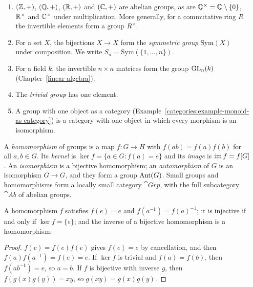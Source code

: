 \begin{example}\label{groups:example-groups}
\begin{enumerate}
\item $(\mathbb{Z}, +)$, $(\mathbb{Q}, +)$, $(\mathbb{R}, +)$ and $(\mathbb{C}, +)$ are abelian groups, as are
$\mathbb{Q}^\times = \mathbb{Q} \setminus \{0\}$, $\mathbb{R}^\times$ and $\mathbb{C}^\times$ under multiplication.
More generally, for a commutative ring $R$ the invertible elements form a group
$R^\times$.
\item For a set $X$, the bijections $X \to X$ form the \emph{symmetric group}
$\mathrm{Sym}(X)$ under composition. We write $S_n = \mathrm{Sym}(\{1, \ldots, n\})$.
\item For a field $k$, the invertible $n \times n$ matrices form the group
$\mathrm{GL}_n(k)$ (Chapter~\ref{linear-algebra}).
\item The \emph{trivial group} has one element.
\item A group with one object as a category (Example~\ref{categories:example-monoid-as-category})
is a category with one object in which every morphism is an isomorphism.
\end{enumerate}
\end{example}

\begin{definition}\label{groups:definition-homomorphism}
A \emph{homomorphism} of groups is a map $f \colon G \to H$ with $f(ab) = f(a)f(b)$
for all $a, b \in G$. Its \emph{kernel} is $\ker f = \{a \in G : f(a) = e\}$ and its
\emph{image} is $\operatorname{im} f = f[G]$. An \emph{isomorphism} is a bijective homomorphism;
an \emph{automorphism} of $G$ is an isomorphism $G \to G$, and they form a group
$\operatorname{Aut}(G)$. Small groups and homomorphisms form a locally small category
$\cat{Grp}$, with the full subcategory $\cat{Ab}$ of abelian groups.
\end{definition}

\begin{lemma}\label{groups:lemma-homomorphism}
A homomorphism $f$ satisfies $f(e) = e$ and $f(a^{-1}) = f(a)^{-1}$; it is
injective if and only if $\ker f = \{e\}$; and the inverse of a bijective
homomorphism is a homomorphism.
\end{lemma}

\begin{proof}
$f(e) = f(e)f(e)$ gives $f(e) = e$ by cancellation, and then
$f(a)f(a^{-1}) = f(e) = e$. If $\ker f$ is trivial and $f(a) = f(b)$, then
$f(ab^{-1}) = e$, so $a = b$. If $f$ is bijective with inverse $g$, then
$f(g(x)g(y)) = xy$, so $g(xy) = g(x)g(y)$.
\end{proof}

